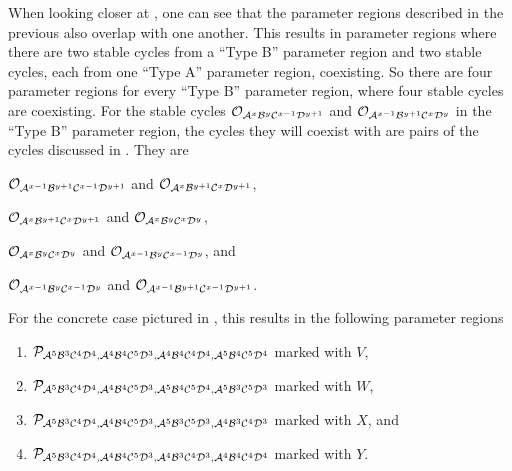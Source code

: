 When looking closer at , one can see that the parameter regions described in the previous  also overlap with one another.
This results in parameter regions where there are two stable cycles from a ``Type B'' parameter region and two stable cycles, each from one ``Type A'' parameter region, coexisting.
So there are four parameter regions for every ``Type B'' parameter region, where four stable cycles are coexisting.
For the stable cycles $\Cycle{\A^x\B^y\C^{x-1}\D^{y+1}}$ and $\Cycle{\A^{x-1}\B^{y+1}\C^x\D^y}$ in the ``Type B'' parameter region, the cycles they will coexist with are pairs of the cycles discussed in .
They are
\begin{enumerate*}
    \item $\Cycle{\A^{x-1}\B^{y+1}\C^{x-1}\D^{y+1}}$ and $\Cycle{\A^x\B^{y+1}\C^x\D^{y+1}}$,
    \item $\Cycle{\A^x\B^{y+1}\C^x\D^{y+1}}$ and $\Cycle{\A^x\B^y\C^x\D^y}$,
    \item $\Cycle{\A^x\B^y\C^x\D^y}$ and $\Cycle{\A^{x-1}\B^y\C^{x-1}\D^y}$, and
    \item $\Cycle{\A^{x-1}\B^y\C^{x-1}\D^y}$ and $\Cycle{\A^{x-1}\B^{y+1}\C^{x-1}\D^{y+1}}$.
\end{enumerate*}
For the concrete case pictured in , this results in the following parameter regions
\begin{enumerate}
    \item $\P_{\A^5\B^3\C^4\D^4, \A^4\B^4\C^5\D^3, \A^4\B^4\C^4\D^4, \A^5\B^4\C^5\D^4}$ marked with $V$,
    \item $\P_{\A^5\B^3\C^4\D^4, \A^4\B^4\C^5\D^3, \A^5\B^4\C^5\D^4, \A^5\B^3\C^5\D^3}$ marked with $W$,
    \item $\P_{\A^5\B^3\C^4\D^4, \A^4\B^4\C^5\D^3, \A^5\B^3\C^5\D^3, \A^4\B^3\C^4\D^3}$ marked with $X$, and
    \item $\P_{\A^5\B^3\C^4\D^4, \A^4\B^4\C^5\D^3, \A^4\B^3\C^4\D^3, \A^4\B^4\C^4\D^4}$ marked with $Y$.
\end{enumerate}
